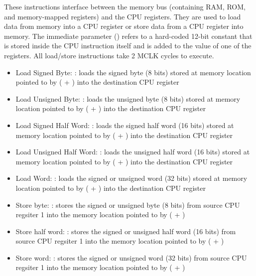 \documentclass[11pt,pdftex,portrait,letterpaper]{article}
\begin{document}
These instructions interface between the memory bus (containing RAM, ROM, and memory-mapped registers) and the CPU registers. They are used to load data from memory into a CPU register or store data from a CPU register into memory. The immediate parameter () refers to a hard-coded 12-bit constant that is stored inside the CPU instruction itself and is added to the value of one of the registers. All load/store instructions take 2 MCLK cycles to execute.

\begin{itemize}
	\item Load Signed Byte: : loads the signed byte (8 bits) stored at memory location pointed to by ( + ) into the destination CPU register 
	\item Load Unsigned Byte: : loads the unsigned byte (8 bits) stored at memory location pointed to by ( + ) into the destination CPU register 
	\item Load Signed Half Word: : loads the signed half word (16 bits) stored at memory location pointed to by ( + ) into the destination CPU register 
	\item Load Unsigned Half Word: : loads the unsigned half word (16 bits) stored at memory location pointed to by ( + ) into the destination CPU register 
	\item Load Word: : loads the signed or unsigned word (32 bits) stored at memory location pointed to by ( + ) into the destination CPU register 
	\item Store byte: : stores the signed or unsigned byte (8 bits) from source CPU regsiter 1  into the memory location pointed to by ( + )
	\item Store half word: : stores the signed or unsigned half word (16 bits) from source CPU regsiter 1  into the memory location pointed to by ( + )
	\item Store word: : stores the signed or unsigned word (32 bits) from source CPU regsiter 1  into the memory location pointed to by ( + )
\end{itemize}
\end{document}
